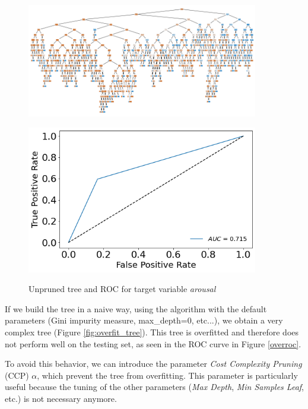 \documentclass[a4paper,11pt,dvipsnames]{article}
\begin{document}
\begin{figure}[h]
\begin{minipage}{0.7\linewidth}
        \centering
    \includegraphics[width=0.9\textwidth]{overfit_tree_arousal.png}
    \label{fig:overfit_tree}
\end{minipage}
\hfill
    \begin{minipage}{0.3\linewidth}
            \centering
            \includegraphics[width=0.9\textwidth]{arousal_overfit_ROC.png}
            \label{overroc}
    \end{minipage}
    \caption{Unpruned tree and ROC for target variable \textit{arousal}}\label{overfit}
\end{figure}

If we build the tree in a naive way, using the algorithm with the default parameters (Gini impurity measure, max\_depth=0, etc...), we obtain a very complex tree (Figure \ref{fig:overfit_tree}). This tree is overfitted and therefore does not perform well on the testing set, as seen in the ROC curve in Figure \ref{overroc}.

To avoid this behavior, we can introduce the parameter \textit{Cost Complexity Pruning} (CCP) $\alpha$, which prevent the tree from overfitting. This parameter is particularly useful because the tuning of the other parameters (\textit{Max Depth}, \textit{Min Samples Leaf}, etc.) is not necessary anymore.
\end{document}
